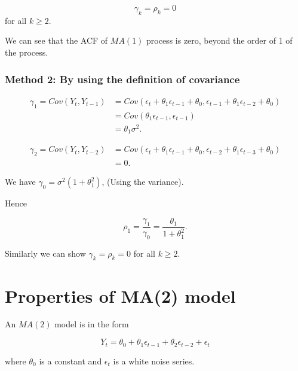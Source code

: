 \documentclass[
  11pt,
  a4paper,
]{report}
\begin{document}
\[\gamma_k = \rho_k=0\] for all \(k \geq 2\).

We can see that the ACF of \(MA(1)\) process is zero, beyond the order
of 1 of the process.

\subsubsection{Method 2: By using the definition of
covariance}\label{method-2-by-using-the-definition-of-covariance}

\begin{equation}
  \label{eq:mtd21}
\begin{aligned}
\gamma_1 = Cov(Y_t, Y_{t-1}) &= Cov(\epsilon_t + \theta_1 \epsilon_{t-1}+ \theta_0, \epsilon_{t-1}+\theta_1 \epsilon_{t-2} + \theta_0)\\
&=Cov(\theta_1 \epsilon_{t-1}, \epsilon_{t-1})\\
&=\theta_1 \sigma^2.
\end{aligned}
\end{equation}

\begin{equation}
  \label{eq:mtd21}
\begin{aligned}
\gamma_2=Cov(Y_t, Y_{t-2}) &= Cov(\epsilon_t + \theta_1 \epsilon_{t-1}+ \theta_0, \epsilon_{t-2}+\theta_1 \epsilon_{t-3} + \theta_0)\\
&=0.
\end{aligned}
\end{equation}

We have \(\gamma_0=\sigma^2(1+\theta_1^2)\), (Using the variance).

Hence

\[\rho_1=\frac{\gamma_1}{\gamma_0}=\frac{\theta_1}{1+\theta_1^2}.\]

Similarly we can show \(\gamma_k=\rho_k=0\) for all \(k \geq 2\).

\section{Properties of MA(2) model}\label{properties-of-ma2-model}

An \(MA(2)\) model is in the form

\begin{equation}
  \label{eq:ma2}
Y_t = \theta_0 + \theta_1 \epsilon_{t-1} + \theta_2 \epsilon_{t-2} + \epsilon_t
\end{equation}

where \(\theta_0\) is a constant and \({\epsilon_t}\) is a white noise
series.
\end{document}
